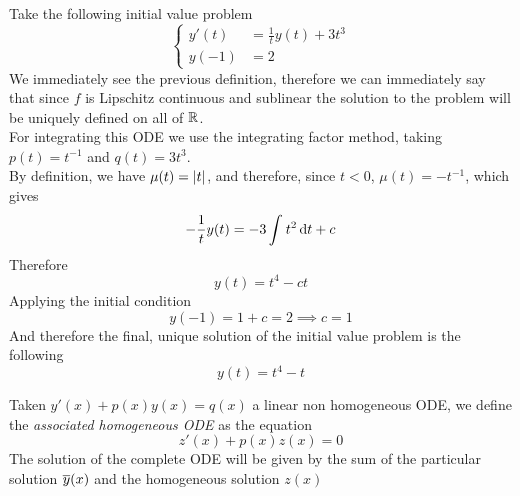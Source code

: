 \documentclass[../complete.tex]{subfiles}
\begin{document}
\begin{eg}
	Take the following initial value problem
	\begin{equation*}
		\left\{\begin{aligned}
			y'(t)&=\frac{1}{t}y(t)+3t^3\\
			y(-1)&=2
		\end{aligned}\right.
	\end{equation*}
	We immediately see the previous definition, therefore we can immediately say that since $f$ is Lipschitz continuous and sublinear the solution to the problem will be uniquely defined on all of $\mathbb{R}$.\\
	For integrating this ODE we use the integrating factor method, taking $p(t)=t^{-1}$ and $q(t)=3t^3$.\\
	By definition, we have $\mu(t)=\abs{t}$, and therefore, since $t<0$, $\mu(t)=-t^{-1}$, which gives
	\begin{equation*}
		-\frac{1}{t}y(t)=-3\int_{}^{}t^2\operatorname{d\!} t+c
	\end{equation*}
	Therefore
	\begin{equation*}
		y(t)=t^4-ct
	\end{equation*}
	Applying the initial condition
	\begin{equation*}
		y(-1)=1+c=2\implies{} c=1
	\end{equation*}
	And therefore the final, unique solution of the initial value problem is the following
	\begin{equation*}
		y(t)=t^4-t
	\end{equation*}
\end{eg}
\begin{thm}
	Taken $y'(x)+p(x)y(x)=q(x)$ a linear non homogeneous ODE, we define the \textit{associated homogeneous ODE} as the equation
	\begin{equation*}
		z'(x)+p(x)z(x)=0
	\end{equation*}
	The solution of the complete ODE will be given by the sum of the particular solution $\overline{y}(x)$ and the homogeneous solution $z(x)$
\end{thm}
\end{document}
